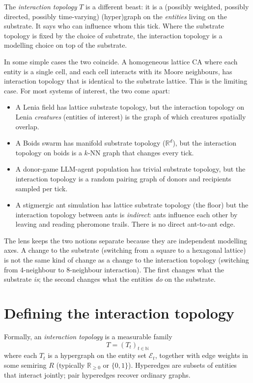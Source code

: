 The \emph{interaction topology} $T$ is a different beast: it is a
(possibly weighted, possibly directed, possibly time-varying)
(hyper)graph on the \emph{entities} living on the substrate. It says
who can influence whom this tick. Where the substrate topology is
fixed by the choice of substrate, the interaction topology is a
modelling choice on top of the substrate.

In some simple cases the two coincide. A homogeneous lattice CA where
each entity is a single cell, and each cell interacts with its Moore
neighbours, has interaction topology that is identical to the
substrate lattice. This is the limiting case. For most systems of
interest, the two come apart:

\begin{itemize}[leftmargin=1.5em,itemsep=2pt]
  \item A Lenia field has lattice substrate topology, but the
    interaction topology on Lenia \emph{creatures} (entities of
    interest) is the graph of which creatures spatially overlap.
  \item A Boids swarm has manifold substrate topology
    ($\mathbb{R}^d$), but the interaction topology on boids is a
    $k$-NN graph that changes every tick.
  \item A donor-game LLM-agent population has trivial substrate
    topology, but the interaction topology is a random pairing graph
    of donors and recipients sampled per tick.
  \item A stigmergic ant simulation has lattice substrate topology
    (the floor) but the interaction topology between ants is
    \emph{indirect}: ants influence each other by leaving and reading
    pheromone trails. There is no direct ant-to-ant edge.
\end{itemize}

The lens keeps the two notions separate because they are independent
modelling axes. A change to the substrate (switching from a square to
a hexagonal lattice) is not the same kind of change as a change to
the interaction topology (switching from 4-neighbour to 8-neighbour
interaction). The first changes what the substrate \emph{is}; the
second changes what the entities \emph{do} on the substrate.

\section{Defining the interaction topology}

Formally, an \emph{interaction topology} is a measurable family
\[
  T = (T_t)_{t \in \mathbb{N}}
\]
where each $T_t$ is a hypergraph on the entity set $\mathcal{E}_t$,
together with edge weights in some semiring $R$ (typically
$\mathbb{R}_{\geq 0}$ or $\{0,1\}$). Hyperedges are subsets of entities
that interact jointly; pair hyperedges recover ordinary graphs.

